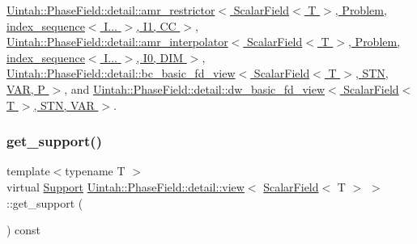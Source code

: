 \hyperlink{classUintah_1_1PhaseField_1_1detail_1_1amr__restrictor_3_01ScalarField_3_01T_01_4_00_01Problem_0778720acc9a55f696b8537356a4dbcae_a3150edfe50702f16b12ced6a2ef77903}{Uintah\+::\+Phase\+Field\+::detail\+::amr\+\_\+restrictor$<$ Scalar\+Field$<$ T $>$, Problem, index\+\_\+sequence$<$ I... $>$, I1, C\+C $>$}, \hyperlink{classUintah_1_1PhaseField_1_1detail_1_1amr__interpolator_3_01ScalarField_3_01T_01_4_00_01Problem64f2458f98b03e27672a091eecc4b696_a890e72b7dfe89f2a0f95bb76d5f7638b}{Uintah\+::\+Phase\+Field\+::detail\+::amr\+\_\+interpolator$<$ Scalar\+Field$<$ T $>$, Problem, index\+\_\+sequence$<$ I... $>$, I0, D\+I\+M $>$}, \hyperlink{classUintah_1_1PhaseField_1_1detail_1_1bc__basic__fd__view_3_01ScalarField_3_01T_01_4_00_01STN_00_01VAR_00_01P_01_4_adc6935173c04499a5a7c769d296a97d7}{Uintah\+::\+Phase\+Field\+::detail\+::bc\+\_\+basic\+\_\+fd\+\_\+view$<$ Scalar\+Field$<$ T $>$, S\+T\+N, V\+A\+R, P $>$}, and \hyperlink{classUintah_1_1PhaseField_1_1detail_1_1dw__basic__fd__view_3_01ScalarField_3_01T_01_4_00_01STN_00_01VAR_01_4_aea06a1fde74c23fae95356021548da34}{Uintah\+::\+Phase\+Field\+::detail\+::dw\+\_\+basic\+\_\+fd\+\_\+view$<$ Scalar\+Field$<$ T $>$, S\+T\+N, V\+A\+R $>$}.

\mbox{\label{classUintah_1_1PhaseField_1_1detail_1_1view_3_01ScalarField_3_01T_01_4_01_4_a3e14b0c7a57a57707bb33954861ab1c1}} 
\subsubsection{\texorpdfstring{get\+\_\+support()}{get\_support()}}
{\footnotesize\ttfamily template$<$typename T $>$ \\
virtual \hyperlink{classUintah_1_1PhaseField_1_1Support}{Support} \hyperlink{classUintah_1_1PhaseField_1_1detail_1_1view}{Uintah\+::\+Phase\+Field\+::detail\+::view}$<$ \hyperlink{structUintah_1_1PhaseField_1_1ScalarField}{Scalar\+Field}$<$ T $>$ $>$\+::get\+\_\+support (\begin{DoxyParamCaption}{ }\end{DoxyParamCaption}) const\hspace{0.3cm}{\ttfamily [pure virtual]}}



